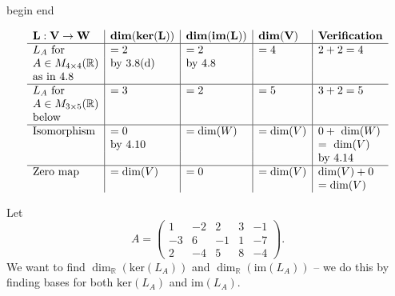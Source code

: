 \documentclass[
  12pt,
  a4paper,
  twoside]{article}
\theoremstyle{plain}
\theoremstyle{definition}
\begin{document}
\csname begin\label{cnj:expl-dimthm}
\csname end

\[
\begin{array}{ l | l | l | l | l } 
\mathbf{L: V \to W} & \mathbf{dim(ker(L))} & \mathbf{dim(im(L))} & \mathbf{dim(V)} & \mathbf{Verification} \\ \hline
L_{A} \text{ for} & =2 & =2 & =4 & 2 + 2 = 4 \\ 
A \in M_{4 \times 4}(\mathbb{R}) & \text{by 3.8(d)} & \text{by 4.8} & & \\
\text{as in 4.8} & & & & \\ \hline
L_{A} \text{ for} & =3 & =2 & =5 & 3 + 2 = 5 \\ 
A \in M_{3 \times 5}(\mathbb{R}) &  &  & & \\
\text{below} & & & & \\ \hline
\text{Isomorphism} & =0 & = \text{dim}(W) & = \text{dim}(V) & 0 + \text{ dim}(W) \\ 
 & \text{by 4.10} & & & = \text{ dim}(V) \\ 
 & & & & \text{by 4.14} \\ \hline
\text{Zero map} & = \text{dim}(V) & =0 & = \text{dim}(V) & \text{dim}(V) + 0 \\
 & & & & = \text{dim}(V)
\end{array}
\]

\def\x{{\mathbf x}}
\def\R{\mathbb{R}}

\noindent
Let
\[
A = \begin{pmatrix} 1&-2&2&3&-1\\ -3&6&-1&1&-7\\ 2&-4&5&8&-4\end{pmatrix}.
\]
We want to find \(\dim_{\mathbb{R}}(\mathrm{ker}(L_A))\) and \(\dim_{\mathbb{R}}(\mathrm{im}(L_A))\) -- we do this by finding bases for both \(\text{ker}(L_A)\) and \(\text{im}(L_A)\).
\end{document}
